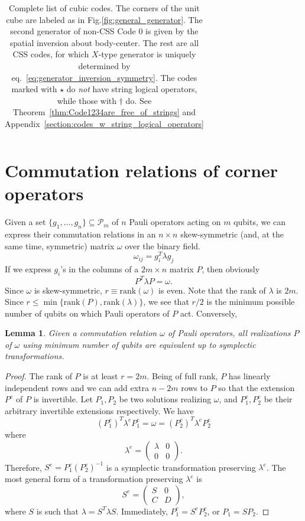 \documentclass[letterpaper,10pt,pra,aps,showpacs,twocolumn]{revtex4-1}
\newtheorem{lem}{Lemma}
\theoremstyle{definition} \newtheorem{defn}{Definition}
\theoremstyle{definition} \newtheorem{remark}{Remark}
\newcommand{\rank}{\mathrm{rank}}
\begin{document}
\begin{table}
\begin{tabular}{c|cccccccc}
\end{tabular}
\caption{Complete list of cubic codes. The corners of the unit cube are labeled as in Fig.\ref{fig:general_generator}. The second generator of non-CSS Code 0 is given by the spatial inversion about body-center. The rest are all CSS codes, for which $X$-type generator is uniquely determined by eq.~\eqref{eq:generator_inversion_symmetry}. The codes marked with $\star$ do \emph{not} have string logical operators, while those with $\dagger$ do. See Theorem~\ref{thm:Code1234are_free_of_strings} and Appendix~\ref{section:codes_w_string_logical_operators} }
\label{tb:list_codes}
\end{table}


\section{Commutation relations of corner operators}
\label{section:comm_rel_corner_operators}

Given a set $\{ g_1, \ldots, g_n \} \subseteq \mathcal{P}_m$ of $n$ Pauli operators acting on $m$ qubits, we can express their commutation relations in an $n \times n$ skew-symmetric (and, at the same time, symmetric) matrix $\omega$ over the binary field.
\[
\omega_{ij} = g_i^T \lambda g_j
\]
If we express $g_i$'s in the columns of a $2m \times n$ matrix $P$, then obviously
\[
  P^T \lambda P = \omega .
\]
Since $\omega$ is skew-symmetric, $r \equiv \rank(\omega)$ is even. Note that the rank of $\lambda$ is $2m$. Since $ r \leq \min \{ \rank(P), \rank(\lambda) \} $, we see that $r/2$ is the minimum possible number of qubits on which Pauli operators of $P$ act. Conversely,
\begin{lem}
 Given a commutation relation $\omega$ of Pauli operators, all realizations $P$ of $\omega$ using minimum number of qubits are equivalent up to symplectic transformations.
\label{lem:unique_realization_of_commutation_relation}
\end{lem}
\begin{proof}
The rank of $P$ is at least $r = 2m$. Being of full rank, $P$ has linearly independent rows and we can add extra $n-2m$ rows to $P$ so that the extension $P^e$ of $P$ is invertible. Let $P_1, P_2$ be two solutions realizing $\omega$, and $P^e_1 , P^e_2$ be their arbitrary invertible extensions respectively. We have
\[
 (P_1^e)^T \lambda^e P_1^e = \omega = (P_2^e)^T \lambda^e P_2^e 
\]
where
\[
\lambda^e = \begin{pmatrix}\lambda & 0 \\ 0 & 0  \end{pmatrix}.
\]
Therefore, $S^e = P_1^e (P_2^e)^{-1}$ is a symplectic transformation preserving $\lambda^e$. The most general form of a transformation preserving $\lambda^e$ is
\[
S^e = \begin{pmatrix} S & 0 \\ C & D \end{pmatrix},
\]
where $S$ is such that $\lambda = S^T \lambda S$. Immediately, $P_1^e = S^e P_2^e$, or $ P_1 = S P_2 $.
\end{proof}
\end{document}
